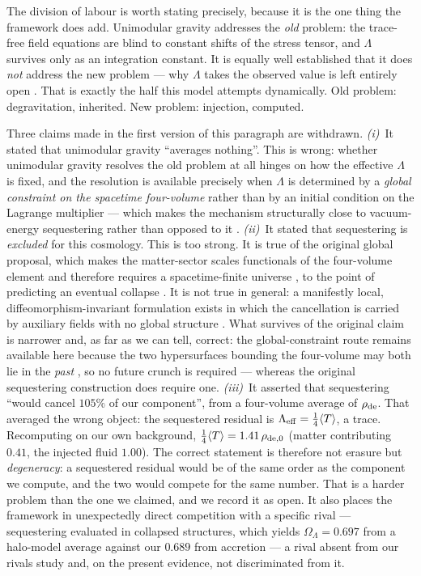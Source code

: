 \documentclass[11pt]{article}
\begin{document}
The division of labour is worth stating precisely, because it is the one thing the framework does
add. Unimodular gravity \cite{Buchmuller1988,HT1989,Ellis2011} addresses the \emph{old} problem:
the trace-free field equations are blind to constant shifts of the stress tensor, and $\Lambda$
survives only as an integration constant. It is equally well established that it does \emph{not}
address the new problem --- why $\Lambda$ takes the observed value is left entirely open
\cite{Weinberg1989,Salvio2024}. That is exactly the half this model attempts dynamically. Old
problem: degravitation, inherited. New problem: injection, computed.

Three claims made in the first version of this paragraph are withdrawn.
\emph{(i)}~It stated that unimodular gravity ``averages nothing''. This is wrong: whether
unimodular gravity resolves the old problem at all hinges on how the effective $\Lambda$ is fixed,
and the resolution is available precisely when $\Lambda$ is determined by a \emph{global
constraint on the spacetime four-volume} rather than by an initial condition on the Lagrange
multiplier --- which makes the mechanism structurally close to vacuum-energy sequestering rather
than opposed to it \cite{Jirousek2023,PadillaSaltas2015}.
\emph{(ii)}~It stated that sequestering is \emph{excluded} for this cosmology. This is too strong.
It is true of the original global proposal, which makes the matter-sector scales functionals of the
four-volume element and therefore requires a spacetime-finite universe \cite{KP2014}, to the point
of predicting an eventual collapse \cite{KP2015}. It is not true in general: a manifestly local,
diffeomorphism-invariant formulation exists in which the cancellation is carried by auxiliary
fields with no global structure \cite{KPSZ2016}. What survives of the original claim is narrower
and, as far as we can tell, correct: the global-constraint route remains available here because
the two hypersurfaces bounding the four-volume may both lie in the \emph{past}
\cite{Jirousek2023}, so no future crunch is required --- whereas the original sequestering
construction does require one.
\emph{(iii)}~It asserted that sequestering ``would cancel $105\%$ of our component'', from a
four-volume average of $\rho_{\rm de}$. That averaged the wrong object: the sequestered residual
is $\Lambda_{\rm eff} = \tfrac14\langle T\rangle$, a trace. Recomputing on our own background,
$\tfrac14\langle T\rangle = 1.41\,\rho_{\rm de,0}$ (matter contributing $0.41$, the injected fluid
$1.00$). The correct statement is therefore not erasure but \emph{degeneracy}: a sequestered
residual would be of the same order as the component we compute, and the two would compete for the
same number. That is a harder problem than the one we claimed, and we record it as open. It also
places the framework in unexpectedly direct competition with a specific rival --- sequestering
evaluated in collapsed structures, which yields $\Omega_\Lambda = 0.697$ from a halo-model
average \cite{Lombriser2018} against our $0.689$ from accretion --- a rival absent from our
rivals study and, on the present evidence, not discriminated from it.
\end{document}
